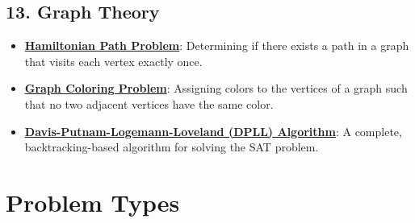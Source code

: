\documentclass{article}%
\begin{document}
\subsection{13.  Graph Theory}%
\label{subsec:13.GraphTheory}%
\begin{itemize}[leftmargin=*]%
\item \href{https://purdue.brightspace.com/d2l/common/assets/pdfjs-d2l-dist/1.0.14-legacy/web/viewer.html?file=\%2Fcontent\%2Fenforced\%2F1095467-wl.202510.CS.24300.001\%2F15L2-SAT.pdf\%3Fou\%3D1095467\&lang=en-us\&container=d2l-fileviewer-rendered-pdf\&fullscreen=d2l-fileviewer-rendered-pdf-dialog\&height=667#page=40}{\textbf{Hamiltonian Path Problem}}: Determining if there exists a path in a graph that visits each vertex exactly once.%
\item \href{https://purdue.brightspace.com/d2l/common/assets/pdfjs-d2l-dist/1.0.14-legacy/web/viewer.html?file=\%2Fcontent\%2Fenforced\%2F1095467-wl.202510.CS.24300.001\%2F15L2-SAT.pdf\%3Fou\%3D1095467\&lang=en-us\&container=d2l-fileviewer-rendered-pdf\&fullscreen=d2l-fileviewer-rendered-pdf-dialog\&height=667#page=47}{\textbf{Graph Coloring Problem}}: Assigning colors to the vertices of a graph such that no two adjacent vertices have the same color.%
\item \href{https://purdue.brightspace.com/d2l/common/assets/pdfjs-d2l-dist/1.0.14-legacy/web/viewer.html?file=\%2Fcontent\%2Fenforced\%2F1095467-wl.202510.CS.24300.001\%2F15L2-SAT.pdf\%3Fou\%3D1095467\&lang=en-us\&container=d2l-fileviewer-rendered-pdf\&fullscreen=d2l-fileviewer-rendered-pdf-dialog\&height=667#page=17}{\textbf{Davis-Putnam-Logemann-Loveland (DPLL) Algorithm}}: A complete, backtracking-based algorithm for solving the SAT problem.%
\end{itemize}

%
\section{Problem Types}%
\label{sec:ProblemTypes}%
\end{document}
